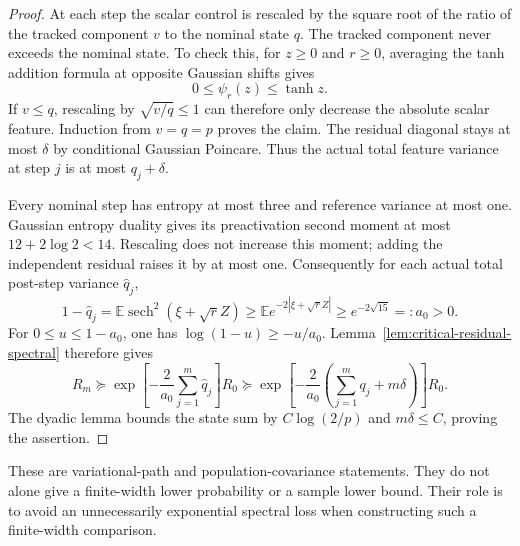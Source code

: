 \begin{proof}
At each step the scalar control is rescaled by the square root of the
ratio of the tracked component $v$ to the nominal state $q$.
The tracked component never exceeds the nominal state. To check this,
for $z\ge0$ and $r\ge0$, averaging the tanh addition formula at
opposite Gaussian shifts gives
\[
 0\le\psi_r(z)\le\tanh z.
\]
If $v\le q$, rescaling by $\sqrt{v/q}\le1$ can therefore only decrease
the absolute scalar feature. Induction from $v=q=p$ proves the claim.
The residual diagonal stays at most $\delta$ by conditional Gaussian
Poincare. Thus the actual total feature variance at step $j$ is at most
$q_j+\delta$.

Every nominal step has entropy at most three and reference variance
at most one. Gaussian entropy duality gives its preactivation second
moment at most $12+2\log2<14$. Rescaling does not increase this moment;
adding the independent residual raises it by at most one. Consequently
for each actual total post-step variance $\widehat q_j$,
\[
 1-\widehat q_j
 =\mathbb E\operatorname{sech}^2(\xi+\sqrt rZ)
 \ge\mathbb E e^{-2|\xi+\sqrt rZ|}
 \ge e^{-2\sqrt{15}}=:a_0>0.
\]
For $0\le u\le1-a_0$, one has $\log(1-u)\ge-u/a_0$.
Lemma~\ref{lem:critical-residual-spectral} therefore gives
\[
 R_m\succeq
 \exp\left[-\frac2{a_0}\sum_{j=1}^m\widehat q_j\right]R_0
 \succeq
 \exp\left[-\frac2{a_0}
       \left(\sum_{j=1}^mq_j+m\delta\right)\right]R_0.
\]
The dyadic lemma bounds the state sum by $C\log(2/p)$ and
$m\delta\le C$, proving the assertion.
\end{proof}

These are variational-path and population-covariance statements.
They do not alone give a finite-width lower probability or a sample
lower bound. Their role is to avoid an unnecessarily exponential
spectral loss when constructing such a finite-width comparison.
